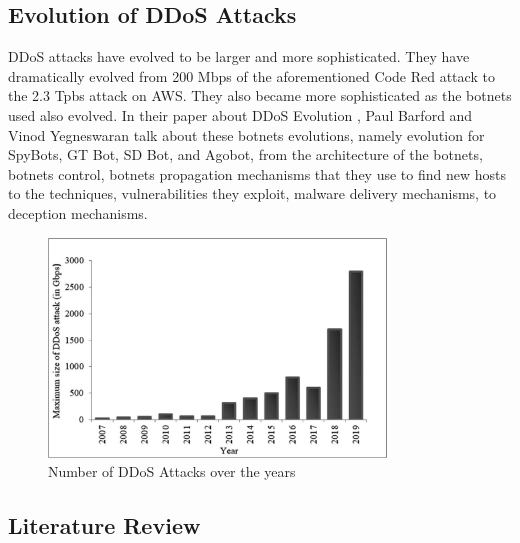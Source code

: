 \documentclass[a4paper, 12pt]{report} %
\begin{document}
        \subsection{Evolution of DDoS Attacks}
            DDoS attacks have evolved to be larger and more sophisticated. They have dramatically evolved from 200 Mbps \cite{ddos_evolution} of the aforementioned Code Red attack to the 2.3 Tpbs attack on AWS. They also became more sophisticated as the botnets used also evolved. In their paper about DDoS Evolution \cite{ddos_evolution}, Paul Barford and Vinod Yegneswaran talk about these botnets evolutions, namely evolution for SpyBots, GT Bot, SD Bot, and Agobot, from the architecture of the botnets, botnets control, botnets propagation mechanisms that they use to find new hosts to the techniques, vulnerabilities they exploit, malware delivery mechanisms, to deception mechanisms. 

            \begin{figure}[h!]
                \centering
                \includegraphics[width=0.8\textwidth]{Images/ddos_evolution.png}
                \caption{Number of DDoS Attacks over the years \cite{ebraryFundamentalsDDoS}}
                \label{fig:ddos_evolution}
            \end{figure}

            

            \subsection{Literature Review}
\end{document}
